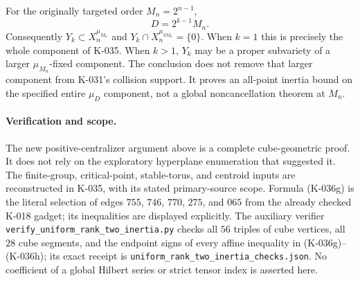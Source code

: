 For the originally targeted order $M_n=2^{n-1}$,
\[
                            D=2^{k-1}M_n.               \tag{K-036i}
\]
Consequently $Y_k\subset X_n^{\mu_{M_n}}$ and
$Y_k\cap X_n^{\mu_{3M_n}}=\{0\}$.  When $k=1$ this
is precisely the whole component of K-035.  When
$k>1$, $Y_k$ may be a proper subvariety of a larger
$\mu_{M_n}$-fixed component.  The conclusion does not
remove that larger component from K-031's collision
support.  It proves an all-point inertia bound on the
specified entire $\mu_D$ component, not a global
noncancellation theorem at $M_n$.

\paragraph{Verification and scope.}
The new positive-centralizer argument above is a complete
cube-geometric proof.  It does not rely on the exploratory
hyperplane enumeration that suggested it.  The finite-group,
critical-point, stable-torus, and centroid inputs are
reconstructed in K-035, with its stated primary-source
scope.  Formula (K-036g) is the literal selection of
edges $755$, $746$, $770$, $275$, and $065$ from the
already checked K-018 gadget; its inequalities are
displayed explicitly.  The auxiliary verifier
\texttt{verify\_uniform\_rank\_two\_inertia.py} checks all
$56$ triples of cube vertices, all $28$ cube segments, and
the endpoint signs of every affine inequality in
(K-036g)--(K-036h); its exact receipt is
\texttt{uniform\_rank\_two\_inertia\_checks.json}.
No coefficient of a global
Hilbert series or strict tensor index is asserted here.
